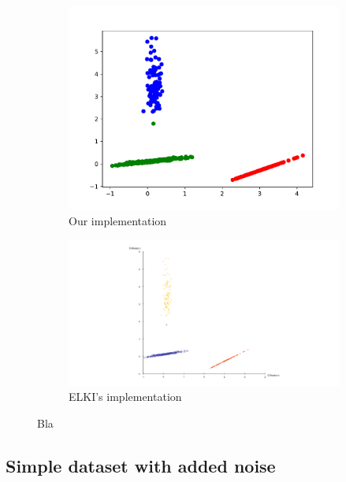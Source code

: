 \documentclass[english]{scrartcl}
\begin{document}
\begin{figure}[tb]
    \centering
    \begin{subfigure}[t]{0.5\textwidth}
        \centering
        \includegraphics[width=\textwidth]{img/test_ours}
        \caption{Our implementation}
        \label{fig:test-ours}
    \end{subfigure}%
    \begin{subfigure}[t]{0.5\textwidth}
        \centering
        \includegraphics[width=\textwidth]{img/test_elki}
        \caption{ELKI's implementation}
    \end{subfigure}

    \caption{Bla}
    \label{fig:test}
\end{figure}

\subsection{Simple dataset with added noise}
\end{document}
